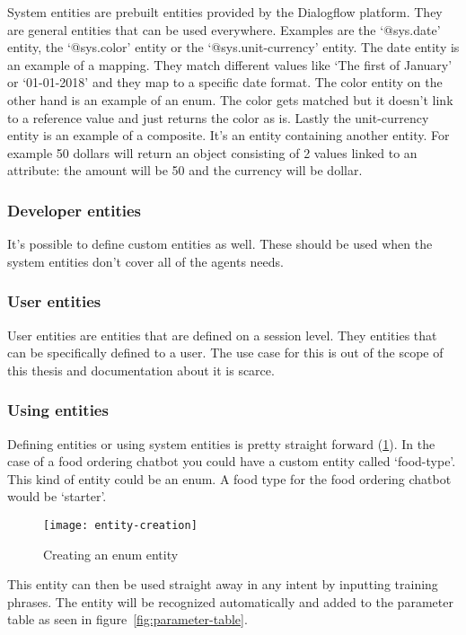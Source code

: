 System entities are prebuilt entities provided by the Dialogflow platform. They are general entities that can be used everywhere. Examples are the `@sys.date' entity, the `@sys.color' entity or the `@sys.unit-currency' entity. The date entity is an example of a mapping. They match different values like `The first of January' or `01-01-2018' and they map to a specific date format. The color entity on the other hand is an example of an enum. The color gets matched but it doesn't link to a reference value and just returns the color as is. Lastly the unit-currency entity is an example of a composite. It's an entity containing another entity. For example 50 dollars will return an object consisting of 2 values linked to an attribute: the amount will be 50 and the currency will be dollar.

\subsubsection{Developer entities}

It's possible to define custom entities as well. These should be used when the system entities don't cover all of the agents needs.

\subsubsection{User entities}

User entities are entities that are defined on a session level. They entities that can be specifically defined to a user. The use case for this is out of the scope of this thesis and documentation about it is scarce.

\subsubsection{Using entities}

Defining entities or using system entities is pretty straight forward (\ref{fig:entity-creation}). In the case of a food ordering chatbot you could have a custom entity called `food-type'. This kind of entity could be an enum. A food type for the food ordering chatbot would be `starter'.

\begin{figure}[ht]
	\centering
	\texttt{[image: entity-creation]}
	\caption{Creating an enum entity}
	\label{fig:entity-creation}
\end{figure}

This entity can then be used straight away in any intent by inputting training phrases. The entity will be recognized automatically and added to the parameter table as seen in figure~\ref{fig:parameter-table}.

